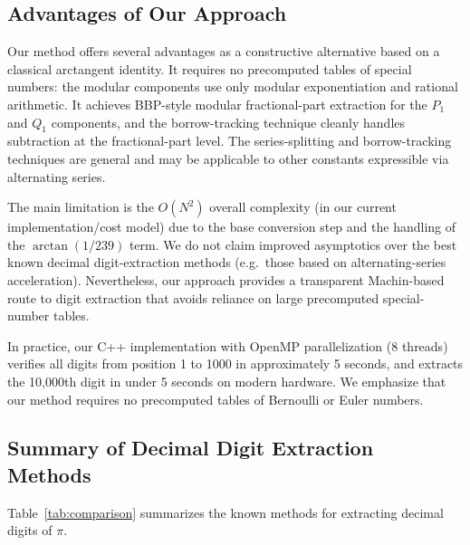 \documentclass[11pt]{article}
\begin{document}
\subsection{Advantages of Our Approach}

Our method offers several advantages as a constructive alternative based on a classical arctangent identity. It requires no precomputed tables of special numbers: the modular components use only modular exponentiation and rational arithmetic. It achieves BBP-style modular fractional-part extraction for the $P_1$ and $Q_1$ components, and the borrow-tracking technique cleanly handles subtraction at the fractional-part level. The series-splitting and borrow-tracking techniques are general and may be applicable to other constants expressible via alternating series.

The main limitation is the $O(N^2)$ overall complexity (in our current implementation/cost model) due to the base conversion step and the handling of the $\arctan(1/239)$ term. We do not claim improved asymptotics over the best known decimal digit-extraction methods (e.g.\ those based on alternating-series acceleration). Nevertheless, our approach provides a transparent Machin-based route to digit extraction that avoids reliance on large precomputed special-number tables.

In practice, our C++ implementation with OpenMP parallelization (8 threads) verifies all digits from position 1 to 1000 in approximately 5 seconds, and extracts the 10{,}000th digit in under 5 seconds on modern hardware. We emphasize that our method requires no precomputed tables of Bernoulli or Euler numbers.

\subsection{Summary of Decimal Digit Extraction Methods}

Table~\ref{tab:comparison} summarizes the known methods for extracting decimal digits of $\pi$.
\end{document}
